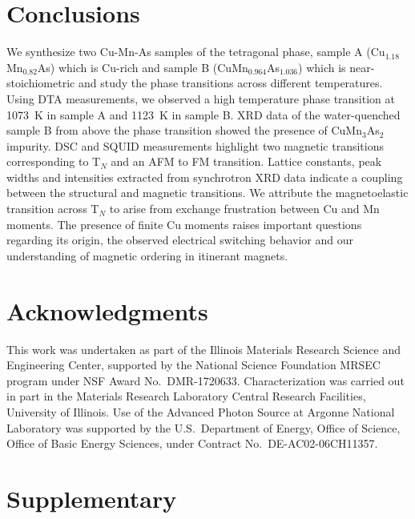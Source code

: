 \documentclass[10pt,doublespacing,edeposit]{uiucthesis2020}
\newcommand*{\cuexcess}{Cu$_{1.18}$Mn$_{0.82}$As}
\newcommand*{\asexcess}{CuMn$_{0.964}$As$_{1.036}$}
\begin{document}
\begin{mainmatter}
\section{Conclusions}
We synthesize two Cu-Mn-As samples of the tetragonal phase, sample A (\cuexcess) which is Cu-rich and sample B (\asexcess) which is near-stoichiometric and study the phase transitions across different temperatures. Using DTA measurements, we observed a high temperature phase transition at 1073~K in sample A and 1123~K in sample B. XRD data of the water-quenched sample B from above the phase transition showed the presence of CuMn$_3$As$_2$ impurity. DSC and SQUID measurements highlight two magnetic transitions corresponding to T$_N$ and an AFM to FM transition. Lattice constants, peak widths and intensities extracted from synchrotron XRD data indicate a coupling between the structural and magnetic transitions. We attribute the magnetoelastic transition across T$_N$ to arise from exchange frustration between Cu and Mn moments. The presence of finite Cu moments raises important questions regarding its origin, the observed electrical switching behavior and our understanding of magnetic ordering in itinerant magnets.



\section{Acknowledgments}
This work was undertaken as part of the Illinois Materials  Research  Science  and  Engineering  Center,  supported by the National Science Foundation MRSEC program under NSF Award No.\ DMR-1720633.
Characterization was carried out in part in the Materials Research Laboratory Central Research Facilities, University of Illinois. Use of the Advanced Photon Source at Argonne National Laboratory was supported by the U.S.\ Department of Energy, Office of Science, Office of Basic Energy Sciences, under Contract No.\ DE-AC02-06CH11357.

\section{Supplementary}



\end{mainmatter}
\end{document}
